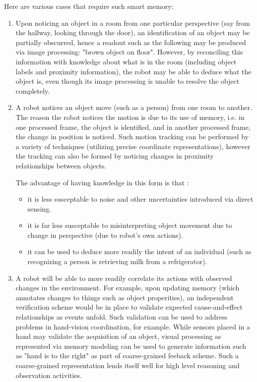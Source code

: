\documentclass[12pt]{amsart}
\begin{document}
Here are various cases that require such smart memory:
\begin{enumerate}
 
\item Upon noticing an object in a room from one particular perspective
(say from the hallway,
looking through the door), an identification of an object may be
partially obscurred,
hence a readout such as the following may be produced via image
processing:  "brown object
on floor".  However, by reconciling this information with knowledge about
what is in the
room (including object labels and proximity information), the robot may
be able to deduce
what the object is, even though its image processing is unable to resolve
the object
completely.
 
\item
 A robot notices an object move (such as a person) from one room to
another.  The reason the
robot notices the motion is due to its use of memory, i.e. in one
processed frame, the object is
identified, and in another processed frame, the change in position is
noticed.  Such motion tracking
can be performed by a variety of techniques (utilizing precise coordinate
representations), however
the tracking can also be formed by noticing changes in proximity
relationships between objects. 

The advantage of having knowledge in this form is that :
\begin{itemize} 
 \item
 it is less susceptable to noise and other uncertainties introduced
via direct sensing.
\item
 it is far less susceptable to misinterpreting object movement due to
change in perspective     (due to robot's own actions).
\item
 it can be used to deduce more readily the intent of an individual
     (such as recognizing a person is retrieving milk from a
refrigerator). 
\end{itemize} 

\item
 A robot will be able to more readily correlate its actions with
observed changes in the environment.  For example, upon updating
memory (which annotates changes to things such as object properities),
an independent verification scheme would be in place to validate
expected cause-and-effect relationships as events unfold.  Such
validation can be used to address problems in hand-vision
coordination, for example.  While sensors placed in a hand may
validate the acquisition of an object, visual processing as
represented via memory modeling can be used to generate information
such as "hand is to the right" as part of coarse-grained feeback
scheme.  Such a coarse-grained representation lends itself well for
high level reasoning and observation activities.
\end{enumerate} 
\end{document}

